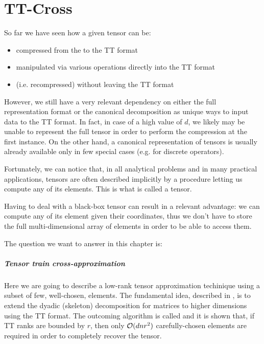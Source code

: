 \chapter{TT-Cross}
So far we have seen how a given tensor can be:
\begin{itemize}
\item compressed from the  to the TT format
\item manipulated via various operations directly into the TT format
\item {} (i.e. recompressed) without leaving the TT format
\end{itemize}

However, we still have a very relevant dependency on either the full representation format or the canonical decomposition as unique ways to input data to the TT format.
In fact, in case of a high value of $d$, we likely may be unable to represent the full tensor in order to perform the compression at the first instance. On the other hand, a canonical representation of tensors is usually already available only in few special cases (e.g. for discrete operators).

Fortunately, we can notice that, in all analytical problems and in many practical applications, tensors are often described implicitly by a procedure letting us compute any of its elements.
This is what is called a  tensor.

Having to deal with a black-box tensor can result in a relevant advantage: we can compute any of its element given their coordinates, thus we don't have to store the full multi-dimensional array of elements in order to be able to access them.

The question we want to answer in this chapter is: 

\paragraph{Tensor train cross-approximation}
Here we are going to describe a low-rank tensor approximation techinique using a subset of few, well-chosen, elements.
The fundamental idea, described in \cite{tt-cross}, is to extend the dyadic (skeleton) decomposition for matrices to higher dimensions using the TT format.
The outcoming algorithm is called  and it is shown  that, if TT ranks are bounded by $r$, then only $\mathcal{O}(dnr^2)$ carefully-chosen elements are required in order to completely recover the tensor.

